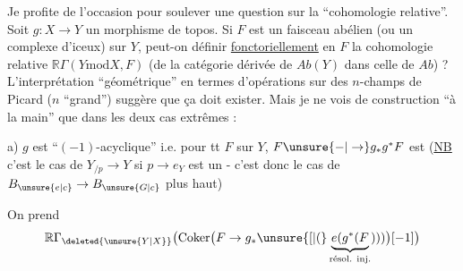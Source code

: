 
Je profite de l'occasion pour soulever une question sur la ``cohomologie relative''. Soit $g:X\to Y$ un morphisme de topos. Si $F$ est un faisceau abélien (ou un complexe d'iceux) sur $Y$, peut-on définir \uline{fonctoriellement} en $F$ la cohomologie relative $\mathbb R\Gamma(Y\mathbin{\mathrm{mod}}X,F)$ (de la catégorie dérivée de $\mathit{Ab}(Y)$ dans celle de $\mathit{Ab}$) ? L'interprétation ``géométrique'' en termes d'opérations sur des $n$-champs de Picard ($n$ ``grand'') suggère que ça doit exister. Mais je ne vois de construction  ``à la main'' que dans les deux cas extrêmes :

a) $g$ est ``$(-1)$-acyclique'' i.e. pour tt $F$ sur $Y$, $F\unsure{\mathord{-}|\to}g_{*}g^{*}F$ est  (\uline{NB} c'est le cas de $Y_{/p}\to Y$ si $p\to e_{Y}$ est un  - c'est donc le cas de $B_{\unsure{e|c}}\to B_{\unsure{G|c}}$ plus haut)

On prend
\[
\mathbb R\Gamma_{\deleted{\unsure{Y|X}}}\bigl(\operatorname{Coker}\bigl(F\to g_{*}\unsure{[|(}\underbrace{e(g^{*}(F}_{\text{résol. inj.}})))\bigr)[-1]\bigr)
\]

